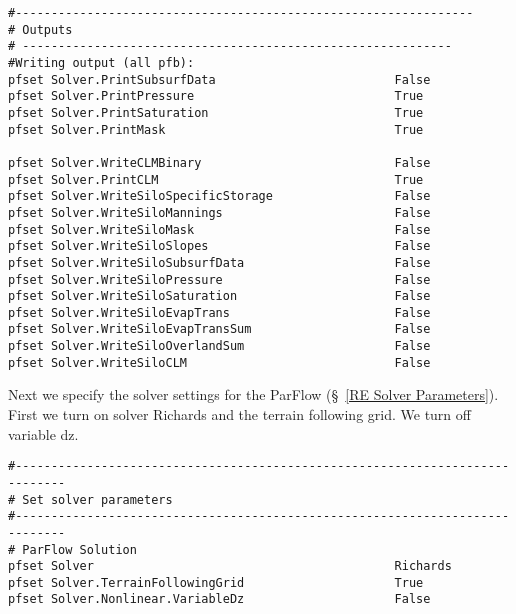 \begin{verbatim}
#----------------------------------------------------------------
# Outputs
# ------------------------------------------------------------
#Writing output (all pfb):
pfset Solver.PrintSubsurfData                         False
pfset Solver.PrintPressure                            True
pfset Solver.PrintSaturation                          True
pfset Solver.PrintMask                                True

pfset Solver.WriteCLMBinary                           False
pfset Solver.PrintCLM                                 True
pfset Solver.WriteSiloSpecificStorage                 False
pfset Solver.WriteSiloMannings                        False
pfset Solver.WriteSiloMask                            False
pfset Solver.WriteSiloSlopes                          False
pfset Solver.WriteSiloSubsurfData                     False
pfset Solver.WriteSiloPressure                        False
pfset Solver.WriteSiloSaturation                      False
pfset Solver.WriteSiloEvapTrans                       False
pfset Solver.WriteSiloEvapTransSum                    False
pfset Solver.WriteSiloOverlandSum                     False
pfset Solver.WriteSiloCLM                             False
\end{verbatim}

Next we specify the solver settings for the ParFlow (\S~\ref{RE Solver Parameters}).
First we turn on solver Richards and the terrain following grid.  We turn off 
variable dz.

\begin{verbatim}
#-----------------------------------------------------------------------------
# Set solver parameters
#-----------------------------------------------------------------------------
# ParFlow Solution
pfset Solver                                          Richards
pfset Solver.TerrainFollowingGrid                     True
pfset Solver.Nonlinear.VariableDz                     False
\end{verbatim}

